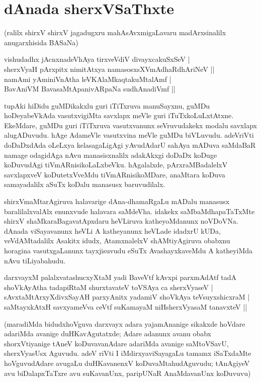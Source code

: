 \chapter{dAnada sherxVSaThxte}\label{chap14}

({}ralilx shirxV shirxV jagadugxru mahAsAvxmigaLavaru madArxsinalilx anugarxhisida BASaNa)

\begin{shloka}
vishudadhx jAcnxnadeVhAya tirxveVdiV divayxcakuSxSeV |\\
sherxVyaH pArxpitx nimitAtxya namasosxsXVmAdhaRdhAriNeV ||\\
namAmi yAminiVnAtha leVKAlaMkaqtakuMtalAmf |\\
BavAniVM BavasaMtApanivARpaNa sudhAnadiVmf ||
\end{shloka}

tupAki hiDidu guMDikakxlu guri iTiTxruva manuSayxnu, guMDu hoDeyabeVkAda vasutxvigiMta savxlapx meVle guri iTuTxkoLuLxtAtxne. EkeMdare, guMDu guri iTiTxruva vasutxvanunx seVruvudakekx modalu savxlapx alugADuvudu. hAge AdameVle vasutxvina meVle guMDu biVLuvudu. adeVriVti doDaDxdAda oLeLxya kelasagaLigAgi yAvudAdarU sahAya mADuva saMdaBaR namage odagidAga nAvu manasisxnalilx adakAkxgi doDaDx koDuge koDuvudAgi tiVmARnisikoLaLxbeVku. hAgalalxde, pArxraMBadalelxV savxlapxveV koDutetxVveMdu tiVmARnisikoMDare, anaMtara koDuva samayadalilx aSuTx koDalu manasusx baruvudilalx.

shirxVmaMtarAgiruva halavarige dAna-dhamaRgaLu mADalu manasusx baralilalxvalAlx enunxvude halavara saMdeVha. idakekx saMbaMdhapaTaTxMte shirxV shaMkaraBagavatApxdaru heVLiruva katheyoMdanunx noVDoVNa. dAnada viSayavanunx heVLi A katheyanunx heVLade idadxrU kUDa, veVdAMtadalilx Asakitx idudx, AtamxnalelxV shAMtiyAgiruva obabxnu horagina vasutxgaLanunx tayxjisuvudu eSuTx AvashayxkaveMdu A katheyiMda nAvu tiLiyabahudu.

\begin{shloka}
darxvayxM palalxvatashucxyXtaM yadi BaveVtf kAvxpi parxmAdAtf tadA\\
shoVkAyAtha tadapiRtaM shurxtavateV toVSAya ca sherxVyaseV |\\
sAvxtaMtArxyXdivxSayAH parxyAnitx yadamiV shoVkAya teVsuyxshicxraM |\\
saMtayxkAtxH savxyameVva ceVtf suKamayaM niHsherxVyasaM tanavxteV ||
\end{shloka}

(maradiMda bidudxhoVguva darxvayx adara yajamAnanige sikakxde hoVdare adariMda avanige duHKavAgutatxde; Adare adanunx avanu obabx shorxVtiyanige tAneV koDuvavanAdare adariMda avanige saMtoVSavU, sherxVyasUsx Aguvudu. adeV riVti I iMdirxyaviSayagaLu tamamx iSaTxdaMte hoVguvudAdare avugaLu duHKavanenxV koDuvaMtahudAguvudu; tAnAgiyeV avu biDalapxTaTxre avu suKavanUnx, paripUNaR AnaMdavanUnx koDuvuvu)

